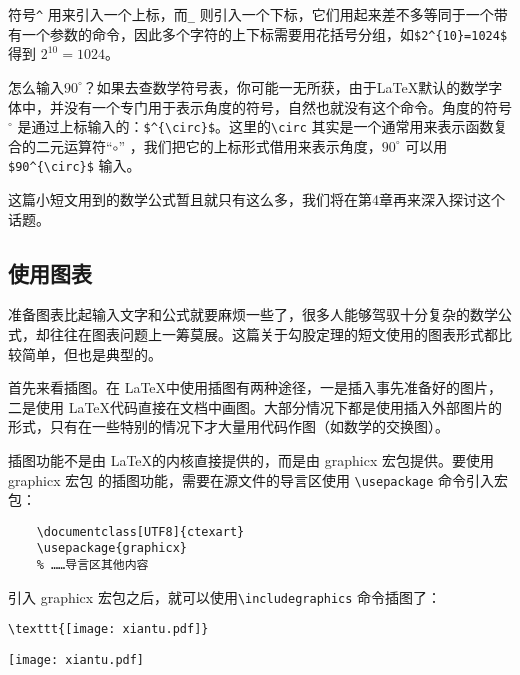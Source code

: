 符号\verb|^| 用来引入一个上标，而\verb|_| 则引入一个下标，它们用起来差不多等同于一个带有一个参数的命令，因此多个字符的上下标需要用花括号分组，如\verb|$2^{10}=1024$| 得到 $2^{10}=1024$。

怎么输入$90^{\circ}$？如果去查数学符号表，你可能一无所获，由于\LaTeX 默认的数学字体中，并没有一个专门用于表示角度的符号，自然也就没有这个命令。角度的符号$^{\circ}$ 是通过上标输入的：\verb|$^{\circ}$|。这里的\verb|\circ| 其实是一个通常用来表示函数复合的二元运算符“$\circ$” ，我们把它的上标形式借用来表示角度，$90^{\circ}$ 可以用 \verb|$90^{\circ}$| 输入。

这篇小短文用到的数学公式暂且就只有这么多，我们将在第4章再来深入探讨这个话题。

\subsection{使用图表}

准备图表比起输入文字和公式就要麻烦一些了，很多人能够驾驭十分复杂的数学公式，却往往在图表问题上一筹莫展。这篇关于勾股定理的短文使用的图表形式都比较简单，但也是典型的。

首先来看插图。在 \LaTeX 中使用插图有两种途径，一是插入事先准备好的图片，二是使用 \LaTeX 代码直接在文档中画图。大部分情况下都是使用插入外部图片的形式，只有在一些特别的情况下才大量用代码作图（如数学的交换图）。

插图功能不是由 \LaTeX 的内核直接提供的，而是由 graphicx 宏包提供。要使用 graphicx 宏包 的插图功能，需要在源文件的导言区使用 \verb|\usepackage| 命令引入宏包：

\begin{lstlisting}
    \documentclass[UTF8]{ctexart}
    \usepackage{graphicx}
    % ……导言区其他内容
\end{lstlisting}

引入 graphicx 宏包之后，就可以使用\verb|\includegraphics| 命令插图了：

\begin{minipage}[t]{0.45\textwidth}
    \begin{lstlisting}
\texttt{[image: xiantu.pdf]}
    \end{lstlisting}
\end{minipage}
\hfill
\begin{minipage}[m]{0.45\textwidth}
    \vspace{0.1cm}
    \hspace{2.5cm} \texttt{[image: xiantu.pdf]}
\end{minipage}

